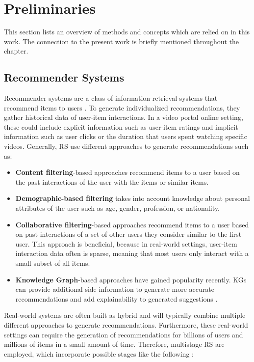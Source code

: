 

\chapter{Preliminaries}
\label{ch:preliminaries}

This section lists an overview of methods and concepts which are relied on in this work. The connection to the present work is briefly mentioned throughout the chapter.

\section{Recommender Systems}
Recommender systems are a class of information-retrieval systems that recommend items to users  \parencite{bobadilla2013recommender}. To generate individualized recommendations, they gather historical data of user-item interactions. In a video portal online setting, these could include explicit information such as user-item ratings and implicit information \parencite{bobadilla2013recommender} such as user clicks or the duration that users spent watching specific videos. Generally, RS use different approaches to generate recommendations \parencite{bobadilla2013recommender} such as: 

\begin{itemize}
    \item \textbf{Content filtering}-based approaches recommend items to a user based on the past interactions of the user with the items or similar items.
    \item \textbf{Demographic-based filtering} takes into account knowledge about personal attributes of the user such as age, gender, profession, or nationality.
    \item \textbf{Collaborative filtering}-based approaches recommend items to a user based on past interactions of a set of other users they consider similar to the first user. This approach is beneficial, because in real-world settings, user-item interaction data often is sparse, meaning that most users only interact with a small subset of all items. 
    \item \textbf{Knowledge Graph}-based approaches have gained popularity recently. KGs can provide additional side information to generate more accurate recommendations and add explainability to generated suggestions \parencite{guo2020survey}.
\end{itemize}


Real-world systems are often built as hybrid \parencite{bobadilla2013recommender} and will typically combine multiple different approaches to generate recommendations. 
Furthermore, these real-world settings can require the generation of recommendations for billions of users and millions of items in a small amount of time. Therefore, multistage RS are employed, which incorporate possible stages like the following \parencite{ma2020off}:

